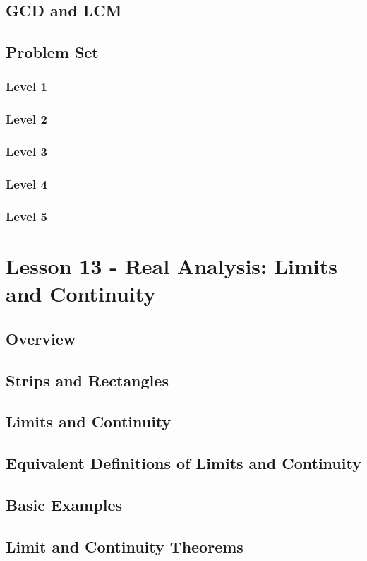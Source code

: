 \documentclass{article}
\begin{document}
\subsection{GCD and LCM}
\subsection{Problem Set}
\subsubsection{Level 1}
\subsubsection{Level 2}
\subsubsection{Level 3}
\subsubsection{Level 4}
\subsubsection{Level 5}
\pagebreak

\section{Lesson 13 - Real Analysis: Limits and Continuity}
\subsection{Overview}
\subsection{Strips and Rectangles}
\subsection{Limits and Continuity}
\subsection{Equivalent Definitions of Limits and Continuity}
\subsection{Basic Examples}
\subsection{Limit and Continuity Theorems}
\end{document}
